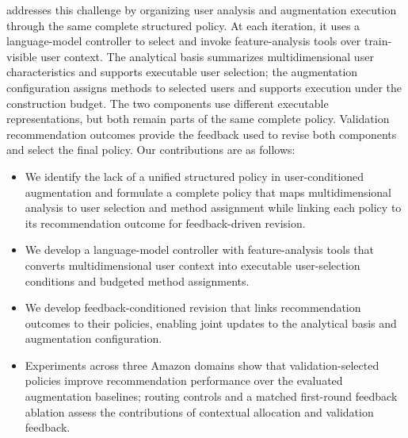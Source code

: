 \method{} addresses this challenge by organizing user analysis and augmentation execution through the same complete structured policy. At each iteration, it uses a language-model controller to select and invoke feature-analysis tools over train-visible user context. The analytical basis summarizes multidimensional user characteristics and supports executable user selection; the augmentation configuration assigns methods to selected users and supports execution under the construction budget. The two components use different executable representations, but both remain parts of the same complete policy. Validation recommendation outcomes provide the feedback used to revise both components and select the final policy. Our contributions are as follows:
\begin{itemize}[leftmargin=*]
    \item We identify the lack of a unified structured policy in user-conditioned augmentation and formulate a complete policy that maps multidimensional analysis to user selection and method assignment while linking each policy to its recommendation outcome for feedback-driven revision.
    \item We develop a language-model controller with feature-analysis tools that converts multidimensional user context into executable user-selection conditions and budgeted method assignments.
    \item We develop feedback-conditioned revision that links recommendation outcomes to their policies, enabling joint updates to the analytical basis and augmentation configuration.
    \item Experiments across three Amazon domains show that validation-selected \method{} policies improve recommendation performance over the evaluated augmentation baselines; routing controls and a matched first-round feedback ablation assess the contributions of contextual allocation and validation feedback.
\end{itemize}
